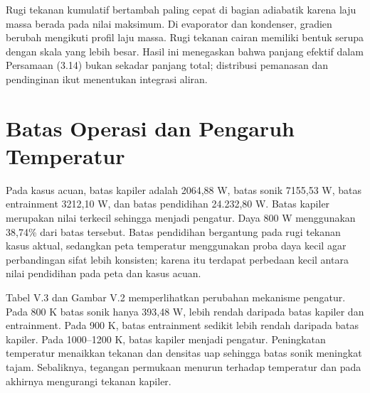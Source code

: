 \documentclass[
  12pt,a4paper,oneside]{report}
\begin{document}
Rugi tekanan kumulatif bertambah paling cepat di bagian adiabatik karena
laju massa berada pada nilai maksimum. Di evaporator dan kondenser,
gradien berubah mengikuti profil laju massa. Rugi tekanan cairan
memiliki bentuk serupa dengan skala yang lebih besar. Hasil ini
menegaskan bahwa panjang efektif dalam Persamaan (3.14) bukan sekadar
panjang total; distribusi pemanasan dan pendinginan ikut menentukan
integrasi aliran.

\hypertarget{batas-operasi-dan-pengaruh-temperatur}{%
\section{Batas Operasi dan Pengaruh
Temperatur}\label{batas-operasi-dan-pengaruh-temperatur}}

Pada kasus acuan, batas kapiler adalah 2064,88 W, batas sonik 7155,53 W,
batas entrainment 3212,10 W, dan batas pendidihan 24.232,80 W. Batas
kapiler merupakan nilai terkecil sehingga menjadi pengatur. Daya 800 W
menggunakan 38,74\% dari batas tersebut. Batas pendidihan bergantung
pada rugi tekanan kasus aktual, sedangkan peta temperatur menggunakan
proba daya kecil agar perbandingan sifat lebih konsisten; karena itu
terdapat perbedaan kecil antara nilai pendidihan pada peta dan kasus
acuan.

Tabel V.3 dan Gambar V.2 memperlihatkan perubahan mekanisme pengatur.
Pada 800 K batas sonik hanya 393,48 W, lebih rendah daripada batas
kapiler dan entrainment. Pada 900 K, batas entrainment sedikit lebih
rendah daripada batas kapiler. Pada 1000--1200 K, batas kapiler menjadi
pengatur. Peningkatan temperatur menaikkan tekanan dan densitas uap
sehingga batas sonik meningkat tajam. Sebaliknya, tegangan permukaan
menurun terhadap temperatur dan pada akhirnya mengurangi tekanan
kapiler.
\end{document}
